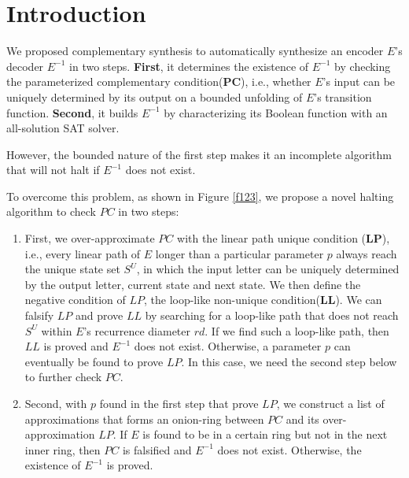 \documentclass[journal]{IEEEtran}
\begin{document}
%
\IEEEpeerreviewmaketitle



\section{Introduction}\label{sec_intro}
We \cite{ShengYuShen:iccad09} proposed complementary synthesis to automatically synthesize an encoder $E$'s decoder $E^{-1}$ in two steps.
\textbf{First},
it determines the existence of $E^{-1}$ by checking the parameterized complementary condition($\boldsymbol{PC}$),
i.e.,
whether $E$'s input can be uniquely determined by its output on a bounded unfolding of $E$'s transition function.
\textbf{Second},
it builds $E^{-1}$ by characterizing its Boolean function with an all-solution SAT solver.

However,
the bounded nature of the first step makes it an incomplete algorithm
that will not halt if $E^{-1}$ does not exist.

To overcome this problem,
as shown in Figure \ref{f123},
we propose a novel halting algorithm to check $PC$ in two steps:
\begin{enumerate}
\item First,
we over-approximate $PC$ with the linear path unique condition ($\boldsymbol{LP}$),
i.e.,
every linear path of $E$ longer than a particular parameter $p$ always reach the unique state set $S^U$,
in which the input letter can be uniquely determined by the output letter, current state and next state.
We then define the negative condition of $LP$,
the loop-like non-unique condition($\boldsymbol{LL}$).
We can falsify $LP$ and prove $LL$ by searching for a loop-like path that does not reach $S^U$ within $E$'s recurrence diameter $rd$.
If we find such a loop-like path,
then $LL$ is proved and $E^{-1}$ does not exist.
Otherwise,
a parameter $p$ can eventually be found to prove $LP$.
In this case,
we need the second step below to further check $PC$.
\item Second,
with $p$ found in the first step that prove $LP$,
we construct a list of approximations that forms an onion-ring between $PC$ and its over-approximation $LP$.
If $E$ is found to be in a certain ring but not in the next inner ring,
then $PC$ is falsified and $E^{-1}$ does not exist.
Otherwise,
the existence of $E^{-1}$ is proved.
\end{enumerate}
\end{document}
